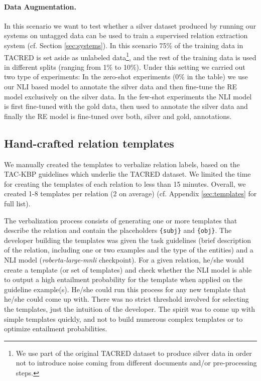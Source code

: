 \documentclass[11pt]{article}
\begin{document}
\paragraph{Data Augmentation.} In this scenario we want to test whether a silver dataset produced by running our systems on untagged data can be used to train a supervised relation extraction system (cf. Section \ref{sec:systems}). In this scenario 75\% of the training data in TACRED is set aside as unlabeled data\footnote{We use part of the original TACRED dataset to produce silver data in order not to introduce noise coming from different documents and/or pre-processing steps.}, and the rest of the training data is used in different splits (ranging from 1\% to 10\%). Under this setting we carried out two type of experiments: In the zero-shot experiments (0\% in the table) we use our NLI based model
to annotate the silver data and then fine-tune the RE model exclusively on the silver data. In the few-shot experiments the NLI model is first fine-tuned with the gold data, then used to annotate the silver data and finally the RE model is fine-tuned over both, silver and gold, annotations.

\subsection{Hand-crafted relation templates} 
\label{ssec:templates}

We manually created the templates to verbalize relation labels, based on the TAC-KBP guidelines which underlie the TACRED dataset. We limited the time for creating the templates of each relation to less than 15 minutes. Overall, we created 1-8 templates per relation (2 on average) (cf. Appendix \ref{sec:templates} for full list).





The verbalization process consists of generating one or more templates that describe the relation and contain the placeholders \texttt{\{subj\}} and \texttt{\{obj\}}. The developer building the templates was given the task guidelines (brief description of the relation, including one or two examples and the type of the entities) and a NLI model (\textit{roberta-large-mnli} checkpoint). For a given relation, he/she would create a template (or set of templates) and check whether the NLI model is able to output a high entailment probability for the template when applied on the guideline example(s). He/she could run this process for any new template that he/she could come up with. There was no strict threshold involved for selecting the templates, just the intuition of the developer. The spirit was to come up with simple templates quickly, and not to build numerous complex templates or to optimize entailment probabilities. 
\end{document}
